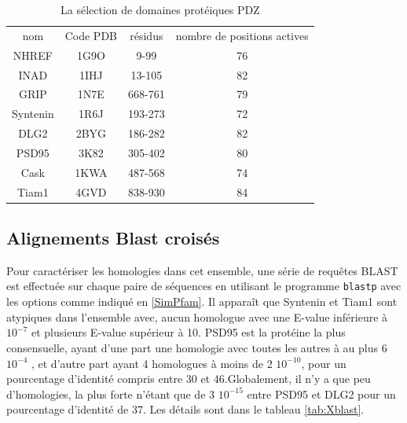 \begin{table}[!htbp]
  \centering
  \caption{La sélection de domaines protéiques PDZ}
  \begin{tabular}{cccc}
    \toprule
    nom & Code PDB & résidus & nombre de positions actives\\
    \cmidrule{1-4}
    NHREF    & 1G9O  & 9-99    & 76 \\
    INAD     & 1IHJ  & 13-105  & 82 \\
    GRIP     & 1N7E  & 668-761 & 79 \\
    Syntenin & 1R6J  & 193-273 & 72 \\
    DLG2     & 2BYG  & 186-282 & 82 \\
    PSD95    & 3K82  & 305-402 & 80 \\
    Cask     & 1KWA  & 487-568 & 74 \\
    Tiam1    & 4GVD  & 838-930 & 84 \\
    \bottomrule
    
  \end{tabular}      
  \label{tab:protéines_PDZ}      
\end{table}

\subsection{Alignements Blast croisés}
   
Pour caractériser les homologies dans cet ensemble, une série de requêtes BLAST est effectuée sur chaque paire de séquences en utilisant le programme \verb!blastp! avec les options comme indiqué en \ref{SimPfam}. Il apparaît que Syntenin et Tiam1 sont atypiques dans l'ensemble avec, aucun homologue avec une E-value inférieure à $10^{-7}$ et plusieurs E-value supérieur à 10. PSD95 est la protéine la plus consensuelle, ayant d'une part une homologie avec toutes les autres à au plus 6 $10^{-4}$ , et d'autre part ayant 4 homologues à moins de 2 $10^{-10}$, pour un pourcentage d'identité compris entre 30 et 46.Globalement, il n'y a que peu d'homologies, la plus forte n'étant que de 3 $10^{-15}$ entre PSD95 et DLG2 pour un pourcentage d'identité de 37. Les détails sont dans le tableau \ref{tab:Xblast}.



